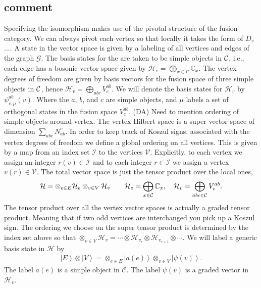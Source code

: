 \documentclass[12pt,a4paper]{article}
\newcommand{\tp}{\otimes}
\newcommand{\ket}[1]{\ensuremath{\left|#1\right\rangle}}
\newcommand{\dave}[1]{{\color{ao(english)}\footnotesize{(DA) #1}}}
\begin{document}
\subsection{comment}
Specifying the isomorphism makes use of the pivotal structure of the fusion category. 
We can always pivot each vertex so that locally it takes the form of $D_v$....
A state in the vector space is given by a labeling of all vertices and edges of the graph ${\mathcal G}$. 
The basis states for the are taken to be simple objects in $\cal{C}$, i.e., each edge has a bosonic vector space given by $\mathcal{H}_e = \bigoplus_{x \in \mathcal{C}} \mathbb{C}_x$.
The vertex degrees of freedom are given by basis vectors for the fusion space of three simple objects in $\cal C$, hence $\mathcal{H}_v = \bigoplus_{abc} V^{ab}_c$.
We will denote the basis states for $\mathcal{H}_v$ by $\psi^{ab}_{c,\mu}(v)$. 
Where the $a$, $b$, and $c$ are simple objects, and $\mu$ labels a set of orthogonal states in the fusion space $V^{ab}_c$.
\dave{Need to mention ordering of simple objects around vertex.}
The vertex Hilbert space is a super vector space of dimension $\sum_{abc} N_{ab}^c$.
In order to keep track of Koszul signs, associated with the vertex degrees of freedom we define a global ordering on all vertices.
This is given by a map from an index set $\mathcal{I}$ to the vertices $\mathcal{V}$. 
Explicitly, to each vertex we assign an integer $r(v) \in \mathcal{I}$ and to each integer $ r \in \mathcal{I}$ we assign a vertex $v(r) \in \mathcal{V}$. 
The total vector space is just the tensor product over the local ones,
\begin{align}
\mathcal{H}= \tp_{e \in E } \mathcal{H}_e \tp_{v \in V} \mathcal{H}_{v}\quad \quad \mathcal{H}_e = \bigoplus_{x \in \cal{C}} \mathbb{C}_x,\quad   \mathcal{H}_v = \bigoplus_{abc \in \cal{C}} V^{ab}_{c}. 
\label{HamiltonianVectorSpace}
\end{align}
The tensor product over all the vertex vector spaces is actually a graded tensor product. 
Meaning that if two odd vertices are interchanged you pick up a Koszul sign.
The ordering we choose on the super tensor product is determined by the index set above so that $\tp_{v \in V} \mathcal{H}_v =\cdots \tp \mathcal{H}_{v_r} \tp \mathcal{H}_{v_{r+1}} \tp \cdots $.
We will label a generic basis state in $\mathcal{H}$ by
\begin{align}
\ket{E} \tp \ket{V} = \tp_{e \in E} \ket{a(e)} \tp_{v\in V} \ket{\psi(v)}.
\end{align}
The label $a(e)$ is a simple object in $\mathcal{C}$. 
The label $\psi(v)$ is a graded vector in $\mathcal{H}_v$. 
\end{document}

